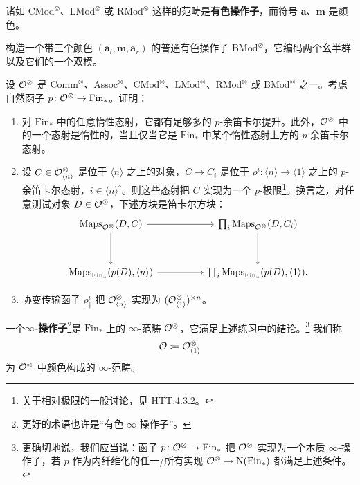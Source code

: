 \nitem\label{L21-2.8} 诸如 $\mathrm{CMod}^{\otimes}$、$\mathrm{LMod}^{\otimes}$ 或 $\mathrm{RMod}^{\otimes}$ 这样的范畴是\textbf{有色操作子}，而符号 $\mathbf{a}$、$\mathbf{m}$ 是颜色。

\begin{exercise}\label{L21-2.9}
构造一个带三个颜色 $(\mathbf{a}_l,\mathbf{m},\mathbf{a}_r)$ 的普通有色操作子 $\mathrm{BMod}^{\otimes}$，它编码两个幺半群以及它们的一个双模。
\end{exercise}

\begin{exercise}\label{L21-2.10}
设 $\mathcal{O}^{\otimes}$ 是 $\mathrm{Comm}^{\otimes}$、$\mathrm{Assoc}^{\otimes}$、$\mathrm{CMod}^{\otimes}$、$\mathrm{LMod}^{\otimes}$、$\mathrm{RMod}^{\otimes}$ 或 $\mathrm{BMod}^{\otimes}$ 之一。考虑自然函子 $p\colon\mathcal{O}^{\otimes}\to\mathrm{Fin}_{*}$。证明：
\begin{enumerate}[label=(\arabic*),leftmargin=2.4em,itemsep=0.1em]
\item 对 $\mathrm{Fin}_{*}$ 中的任意惰性态射，它都有足够多的 $p$-余笛卡尔提升。此外，$\mathcal{O}^{\otimes}$ 中的一个态射是惰性的，当且仅当它是 $\mathrm{Fin}_{*}$ 中某个惰性态射上方的 $p$-余笛卡尔态射。
\item 设 $C\in\mathcal{O}^{\otimes}_{\langle n\rangle}$ 是位于 $\langle n\rangle$ 之上的对象，$C\to C_i$ 是位于 $\rho^{i}\colon\langle n\rangle\to\langle 1\rangle$ 之上的 $p$-余笛卡尔态射，$i\in\langle n\rangle^{\circ}$。则这些态射把 $C$ 实现为一个 $p$-极限\footnote{关于相对极限的一般讨论，见 HTT.4.3.2。}。换言之，对任意测试对象 $D\in\mathcal{O}^{\otimes}$，下述方块是笛卡尔方块：
\[
\begin{tikzcd}[column sep=4.8em,row sep=3.2em]
\mathrm{Maps}_{\OO^{\otimes}}(D,C)\arrow[r]\arrow[d] & \prod_i\mathrm{Maps}_{\OO^{\otimes}}(D,C_i)\arrow[d] \\
\mathrm{Maps}_{\mathrm{Fin}_{*}}(p(D),\langle n\rangle)\arrow[r] & \prod_i\mathrm{Maps}_{\mathrm{Fin}_{*}}(p(D),\langle 1\rangle).
\end{tikzcd}
\]
\item 协变传输函子 $\rho^{i}_{\dagger}$ 把 $\mathcal{O}^{\otimes}_{\langle n\rangle}$ 实现为 $(\mathcal{O}^{\otimes}_{\langle 1\rangle})^{\times n}$。
\end{enumerate}
\end{exercise}

\begin{definition}\label{L21-2.11}
一个\textbf{$\infty$-操作子}\footnote{更好的术语也许是“有色 $\infty$-操作子”。}是 $\mathrm{Fin}_{*}$ 上的 $\infty$-范畴 $\mathcal{O}^{\otimes}$，它满足上述练习中的结论。\footnote{更确切地说，我们应当说：函子 $p\colon\mathcal{O}^{\otimes}\to\mathrm{Fin}_{*}$ 把 $\mathcal{O}^{\otimes}$ 实现为一个本质 $\infty$-操作子，若 $p$ 作为内纤维化的任一/所有实现 $\mathcal{O}^{\otimes}\to\mathrm{N}(\mathrm{Fin}_{*})$ 都满足上述条件。} 我们称
\[
\mathcal{O}\coloneqq\mathcal{O}^{\otimes}_{\langle 1\rangle}
\]
为 $\mathcal{O}^{\otimes}$ 中颜色构成的 $\infty$-范畴。
\end{definition}

